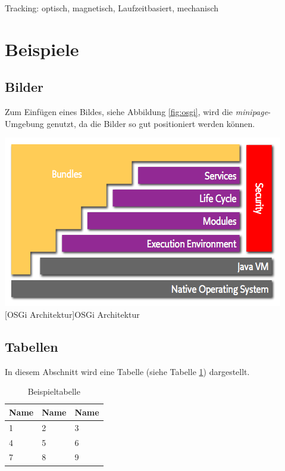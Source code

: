 \documentclass[12pt,a4paper,bibliography=totocnumbered,listof=totocnumbered]{scrartcl}
\begin{document}
Tracking: optisch, magnetisch, Laufzeitbasiert, mechanisch   
\renewcommand\refname{Quellenverzeichnis}


\pagebreak

\section{Beispiele}


\subsection{Bilder}
Zum Einfügen eines Bildes, siehe Abbildung \ref{fig:osgi}, wird die \textit{minipage}-Umgebung genutzt, da die Bilder so gut positioniert werden können.

\vspace{1em}
\begin{minipage}{\linewidth}
	\centering
	\includegraphics[width=0.7\linewidth]{Bilder/layering-osgi.png}
	[OSGi Architektur]{OSGi Architektur\footnotemark }
	\label{fig:osgi}
\end{minipage}

\subsection{Tabellen}
In diesem Abschnitt wird eine Tabelle (siehe Tabelle \ref{tab:beispiel}) dargestellt.

\vspace{1em}
\begin{table}[!h]
	\centering
	\begin{tabular}{|l|l|l|}
		\hline
		\textbf{Name} & \textbf{Name} & \textbf{Name}\\
		\hline
		1 & 2 & 3\\
		\hline
		4 & 5 & 6\\
		\hline
		7 & 8 & 9\\
		\hline
	\end{tabular}
	\caption{Beispieltabelle}
	\label{tab:beispiel}
\end{table}
\end{document}
